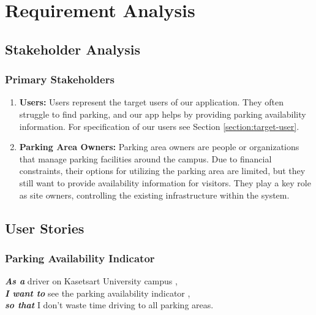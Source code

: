 
\newcommand{\userstory}[4]{%
    \refstepcounter{nuserstory}
    \subsection{#1}
    \label{userstory:\thenuserstory}
    \hangindent=40pt
    \textbf{\textit{As a}} #2,\\
    \textbf{\textit{I want to}} #3,\\
    \textbf{\textit{so that}} #4.
}


\chapter{Requirement Analysis}
\label{chap:requirement-analysis}

\section{Stakeholder Analysis}
\label{section:stakeholder-analysis}
\subsection{Primary Stakeholders}
\label{subsection:primary-stakeholders}

\begin{enumerate}[leftmargin=80pt]
    \item \textbf{Users:} Users represent the target users of our application. They often struggle to find parking, and our app helps by providing parking availability information. For specification of our users see Section \ref{section:target-user}.
    \item \textbf{Parking Area Owners:} Parking area owners are people or organizations that manage parking facilities around the campus. Due to financial constraints, their options for utilizing the parking area are limited, but they still want to provide availability information for visitors. They play a key role as site owners, controlling the existing infrastructure within the system.
\end{enumerate}

\section{User Stories}
\label{section:user-stories}

\userstory{Parking Availability Indicator%
}{driver on Kasetsart University campus%
}{see the parking availability indicator%
}{I don't waste time driving to all parking areas}

